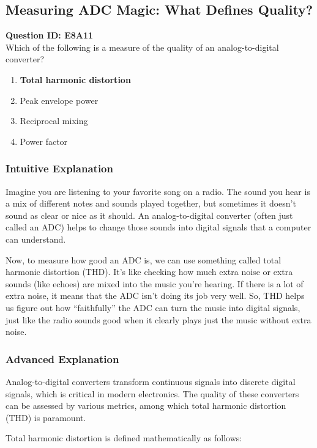 \subsection{Measuring ADC Magic: What Defines Quality?}

\begin{tcolorbox}
\textbf{Question ID: E8A11}\\
Which of the following is a measure of the quality of an analog-to-digital converter?
\begin{enumerate}[label=\Alph*.]
    \item \textbf{Total harmonic distortion}
    \item Peak envelope power
    \item Reciprocal mixing
    \item Power factor
\end{enumerate}
\end{tcolorbox}

\subsubsection{Intuitive Explanation}
Imagine you are listening to your favorite song on a radio. The sound you hear is a mix of different notes and sounds played together, but sometimes it doesn’t sound as clear or nice as it should. An analog-to-digital converter (often just called an ADC) helps to change those sounds into digital signals that a computer can understand. 

Now, to measure how good an ADC is, we can use something called total harmonic distortion (THD). It’s like checking how much extra noise or extra sounds (like echoes) are mixed into the music you’re hearing. If there is a lot of extra noise, it means that the ADC isn’t doing its job very well. So, THD helps us figure out how “faithfully” the ADC can turn the music into digital signals, just like the radio sounds good when it clearly plays just the music without extra noise.

\subsubsection{Advanced Explanation}
Analog-to-digital converters transform continuous signals into discrete digital signals, which is critical in modern electronics. The quality of these converters can be assessed by various metrics, among which total harmonic distortion (THD) is paramount. 

Total harmonic distortion is defined mathematically as follows:

